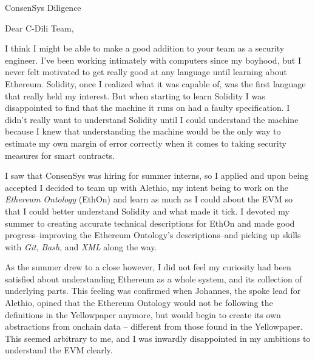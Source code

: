 \documentclass[
	pagenumber=false, %
	parskip=half, %
	fromalign=right, %
	foldmarks=true, %
	addrfield=true %
	]{scrlttr2}
\date{\today} %
\begin{document}
 
\begin{letter}{ConsenSys Diligence} %


\opening{Dear C-Dili Team,}

I think I might be able to make a good addition to your team as a security engineer. I've been working intimately with computers since my boyhood, but I never felt motivated to get really good at any language until learning about Ethereum. Solidity, once I realized what it was capable of, was the first language that really held my interest. But when starting to learn Solidity I was disappointed to find that the machine it runs on had a faulty specification. I didn't really want to understand Solidity until I could understand the machine because I knew that understanding the machine would be the only way to estimate my own margin of error correctly when it comes to taking security measures for smart contracts. 

	I saw that ConsenSys was hiring for summer interns, so I applied and upon being accepted I decided to team up with Alethio, my intent being to work on the \textit{Ethereum Ontology} (EthOn) and learn as much as I could about the EVM so that I could better understand Solidity and what made it tick. I devoted my summer to creating accurate technical descriptions for EthOn and made good progress--improving the Ethereum Ontology's descriptions--and picking up skills with \textit{Git}, \textit{Bash}, and \textit{XML} along the way. 

	As the summer drew to a close however, I did not feel my curiosity had been satisfied about understanding Ethereum as a whole system, and its collection of underlying parts. This feeling was confirmed when Johannes, the spoke lead for Alethio, opined that the Ethereum Ontology would not be following the definitions in the Yellowpaper anymore, but would begin to create its own abstractions from onchain data -- different from those found in the Yellowpaper. This seemed arbitrary to me, and I was inwardly disappointed in my ambitions to understand the EVM clearly. 


\end{letter}
\end{document}
